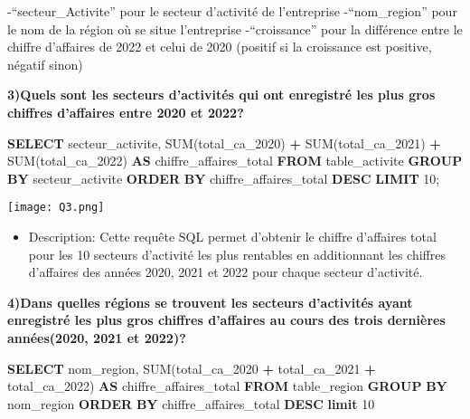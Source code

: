 \documentclass[mstat,12pt]{unswthesis}
\newenvironment{Shaded}{\begin{snugshade}}{\end{snugshade}}
\newcommand{\DecValTok}[1]{\textcolor[rgb]{0.00,0.00,0.81}{#1}}
\newcommand{\FunctionTok}[1]{\textcolor[rgb]{0.00,0.00,0.00}{#1}}
\newcommand{\KeywordTok}[1]{\textcolor[rgb]{0.13,0.29,0.53}{\textbf{#1}}}
\newcommand{\NormalTok}[1]{#1}
\newcommand{\OperatorTok}[1]{\textcolor[rgb]{0.81,0.36,0.00}{\textbf{#1}}}
\begin{document}
-``secteur\_Activite'' pour le secteur d'activité de l'entreprise
-``nom\_region'' pour le nom de la région où se situe l'entreprise
-``croissance'' pour la différence entre le chiffre d'affaires de 2022
et celui de 2020 (positif si la croissance est positive, négatif sinon)

\medskip

\textbf{3)Quels sont les secteurs d'activités qui ont enregistré les
plus gros chiffres d'affaires entre 2020 et 2022?}

\begin{Shaded}
\begin{Highlighting}[]
\KeywordTok{SELECT}\NormalTok{ secteur\_activite, }\FunctionTok{SUM}\NormalTok{(total\_ca\_2020) }\OperatorTok{+} \FunctionTok{SUM}\NormalTok{(total\_ca\_2021) }\OperatorTok{+} \FunctionTok{SUM}\NormalTok{(total\_ca\_2022) }\KeywordTok{AS}\NormalTok{ chiffre\_affaires\_total}
\KeywordTok{FROM}\NormalTok{ table\_activite}
\KeywordTok{GROUP} \KeywordTok{BY}\NormalTok{ secteur\_activite}
\KeywordTok{ORDER} \KeywordTok{BY}\NormalTok{ chiffre\_affaires\_total }\KeywordTok{DESC}
\KeywordTok{LIMIT} \DecValTok{10}\NormalTok{;}
\end{Highlighting}
\end{Shaded}

\texttt{[image: Q3.png]}\bigskip

\begin{itemize}
\tightlist
\item
  Description: Cette requête SQL permet d'obtenir le chiffre d'affaires
  total pour les 10 secteurs d'activité les plus rentables en
  additionnant les chiffres d'affaires des années 2020, 2021 et 2022
  pour chaque secteur d'activité.
\end{itemize}

\bigskip

\textbf{4)Dans quelles régions se trouvent les secteurs d'activités
ayant enregistré les plus gros chiffres d'affaires au cours des trois
dernières années(2020, 2021 et 2022)? }

\begin{Shaded}
\begin{Highlighting}[]
\KeywordTok{SELECT}\NormalTok{ nom\_region, }\FunctionTok{SUM}\NormalTok{(total\_ca\_2020 }\OperatorTok{+}\NormalTok{ total\_ca\_2021 }
\OperatorTok{+}\NormalTok{ total\_ca\_2022) }\KeywordTok{AS}\NormalTok{ chiffre\_affaires\_total}
\KeywordTok{FROM}\NormalTok{ table\_region}
\KeywordTok{GROUP} \KeywordTok{BY}\NormalTok{ nom\_region}
\KeywordTok{ORDER} \KeywordTok{BY}\NormalTok{ chiffre\_affaires\_total }\KeywordTok{DESC} \KeywordTok{limit} \DecValTok{10}
\end{Highlighting}
\end{Shaded}
\end{document}
